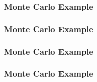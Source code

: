 \documentclass{beamer}
\title{}
\author{}
\date{}
\begin{document}
\begin{frame}
  \frametitle{Monte Carlo Example}
  \begin{figure}[h]
    \centering
  \end{figure}
\end{frame}

\begin{frame}
  \frametitle{Monte Carlo Example}
  \begin{figure}[h]
    \centering
  \end{figure}
\end{frame}

\begin{frame}
  \frametitle{Monte Carlo Example}
  \begin{figure}[h]
    \centering
  \end{figure}
\end{frame}

\begin{frame}
  \frametitle{Monte Carlo Example}
  \begin{figure}[h]
    \centering
  \end{figure}
\end{frame}
\end{document}
